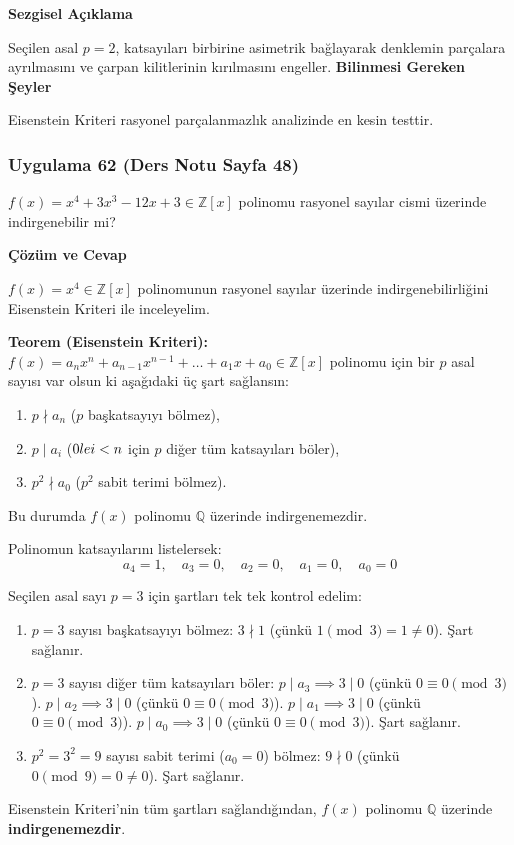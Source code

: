 \documentclass[11pt, a4paper]{article}
\newenvironment{cozum}{
    \vspace{0.5cm}
    \noindent\textcolor{green!60!black}{\faCheckCircle\enspace \textbf{\Large Çözüm ve Cevap}}\par\vspace{0.2cm}
}{}
\newenvironment{sezgisel}{
    \vspace{0.5cm}
    \noindent\textcolor{orange!80!black}{\faLightbulb\enspace \textbf{\Large Sezgisel Açıklama}}\par\vspace{0.2cm}
    \itshape
}{}
\newenvironment{bilgi}{
    \vspace{0.5cm}
    \noindent\textcolor{red!70!black}{\faExclamationTriangle\enspace \textbf{\Large Bilinmesi Gereken Şeyler}}\par\vspace{0.2cm}
}{}
\begin{document}
\begin{sezgisel}
Seçilen asal $p=2$, katsayıları birbirine asimetrik bağlayarak denklemin parçalara ayrılmasını ve çarpan kilitlerinin kırılmasını engeller.
\end{sezgisel}
\begin{bilgi}
Eisenstein Kriteri rasyonel parçalanmazlık analizinde en kesin testtir.
\end{bilgi}

\newpage
\subsubsection{Uygulama 62 (Ders Notu Sayfa 48)}
\begin{sorubox}
$f(x) = x^4 + 3x^3 - 12x + 3 \in \mathbb{Z}[x]$ polinomu rasyonel sayılar cismi üzerinde indirgenebilir mi?
\end{sorubox}
\begin{cozum}
$f(x) = x^{4} \in \mathbb{Z}[x]$ polinomunun rasyonel sayılar üzerinde indirgenebilirliğini Eisenstein Kriteri ile inceleyelim.

\textbf{Teorem (Eisenstein Kriteri):} $f(x) = a_n x^n + a_{n-1} x^{n-1} + \dots + a_1 x + a_0 \in \mathbb{Z}[x]$ polinomu için bir $p$ asal sayısı var olsun ki aşağıdaki üç şart sağlansın:
\begin{enumerate}
    \item $p \nmid a_n$ ($p$ başkatsayıyı bölmez),
    \item $p \mid a_i$ ($0 \\le i < n$ için $p$ diğer tüm katsayıları böler),
    \item $p^2 \nmid a_0$ ($p^2$ sabit terimi bölmez).
\end{enumerate}
Bu durumda $f(x)$ polinomu $\mathbb{Q}$ üzerinde indirgenemezdir.

Polinomun katsayılarını listelersek:
\[ a_{4} = 1, \quad a_{3} = 0, \quad a_{2} = 0, \quad a_{1} = 0, \quad a_{0} = 0 \]

Seçilen asal sayı $p = 3$ için şartları tek tek kontrol edelim:
\begin{enumerate}
    \item $p = 3$ sayısı başkatsayıyı bölmez: $3 \nmid 1$ (çünkü $1 \pmod{3} = 1 \neq 0$). Şart sağlanır.
    \item $p = 3$ sayısı diğer tüm katsayıları böler:
    $p \mid a_{3} \implies 3 \mid 0$ (çünkü $0 \equiv 0 \pmod{3}$).
    $p \mid a_{2} \implies 3 \mid 0$ (çünkü $0 \equiv 0 \pmod{3}$).
    $p \mid a_{1} \implies 3 \mid 0$ (çünkü $0 \equiv 0 \pmod{3}$).
    $p \mid a_{0} \implies 3 \mid 0$ (çünkü $0 \equiv 0 \pmod{3}$).
    Şart sağlanır.
    \item $p^2 = 3^2 = 9$ sayısı sabit terimi ($a_0 = 0$) bölmez: $9 \nmid 0$ (çünkü $0 \pmod{9} = 0 \neq 0$). Şart sağlanır.
\end{enumerate}

Eisenstein Kriteri'nin tüm şartları sağlandığından, $f(x)$ polinomu $\mathbb{Q}$ üzerinde \textbf{indirgenemezdir}.
\end{cozum}
\end{document}
